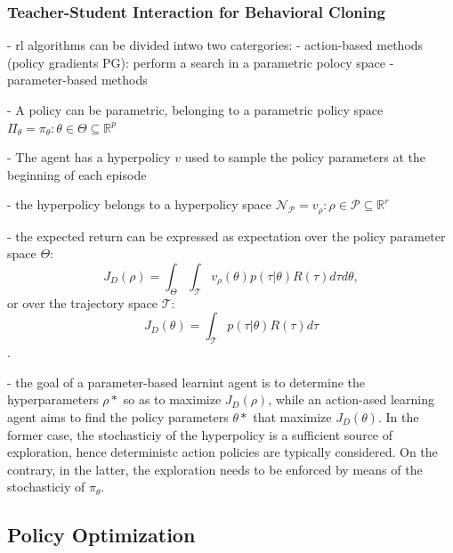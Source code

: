 \subsubsection{Teacher-Student Interaction for Behavioral Cloning}
\label{teacher-student}

\cite{il}





- rl algorithms can be divided intwo two catergories: 
	- action-based methods (policy gradients PG):
		perform a search in a parametric polocy space 
	- parameter-based methods












- A policy can be parametric, belonging to a parametric policy space 
\(\Pi_\theta = {\pi_\theta:\theta \in \Theta \subseteq \mathbb{R}^p}\)

- The agent has a hyperpolicy $v$ used to sample the policy parameters at the beginning of each episode

- the hyperpolicy belongs to a hyperpolicy space \(\mathcal{N}_\mathcal{P} = {v_\rho:\rho \in \mathcal{P} \subseteq \mathbb{R}^r}\)


- the expected return can be expressed as expectation over the policy parameter space $\Theta$: \[\] \[ J_D(\rho) = \int_{\Theta} \int_{\mathcal{T}} v_\rho(\theta)p(\tau|\theta)R(\tau)d\tau d\theta, \] or over the trajectory space $\mathcal{T}$: \[J_D(\theta) = \int_{\mathcal{T}} p(\tau|\theta)R(\tau)d\tau\].


- the goal of a parameter-based learnint agent is to determine the hyperparameters \(\rho*\) so as to maximize \(J_D(\rho)\), while an action-ased learning agent aims to find the policy parameters \(\theta*\) that maximize \(J_D(\theta)\). In the former case, the stochasticiy of the hyperpolicy is a sufficient source of exploration, hence deterministc action policies are typically considered. On the contrary, in the latter, the exploration needs to be enforced by means of the stochasticiy of $\pi_\theta$.





\subsection{Policy Optimization}




